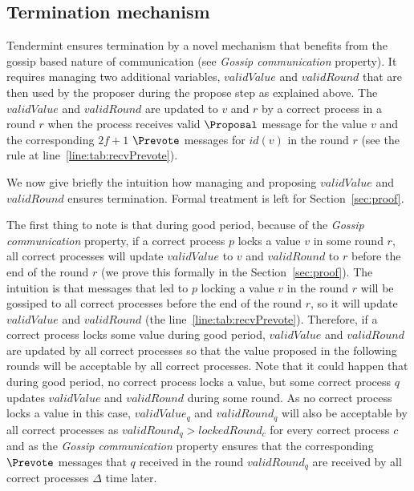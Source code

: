 \subsection{Termination mechanism}

Tendermint ensures termination by a novel mechanism that benefits from the
gossip based nature of communication (see \emph{Gossip communication}
property).  It requires managing two additional variables, $validValue$ and
$validRound$ that are then used by the proposer during the propose step as
explained above.   The $validValue$ and $validRound$ are updated to $v$ and $r$
by a correct process in a round $r$ when the process receives valid $\Proposal$
message for the value $v$ and the corresponding $2f+1$ $\Prevote$ messages for
$id(v)$ in the round $r$ (see the rule at line~\ref{line:tab:recvPrevote}).

We now give briefly the intuition how managing and proposing $validValue$
and $validRound$ ensures termination. Formal treatment is left for
Section~\ref{sec:proof}.  

The first thing to note is that during good period, because of the
\emph{Gossip communication} property, if a correct process $p$ locks a value
$v$ in some round $r$, all correct processes will update $validValue$ to $v$
and $validRound$ to $r$ before the end of the round $r$ (we prove this formally
in the Section~\ref{sec:proof}). The intuition is that messages that led to $p$
locking a value $v$ in the round $r$ will be gossiped to all correct processes
before the end of the round $r$, so it will update $validValue$ and
$validRound$ (the line~\ref{line:tab:recvPrevote}). Therefore, if a correct
process locks some value during good period, $validValue$ and $validRound$ are
updated by all correct processes so that the value proposed in the following
rounds will be acceptable by all correct processes. Note 
that it could happen that during good period, no correct process locks a value,
but some correct process $q$ updates $validValue$ and $validRound$ during some
round. As no correct process locks a value in this case, $validValue_q$ and
$validRound_q$ will also be acceptable by all correct processes as
$validRound_q > lockedRound_c$ for every correct process $c$ and as the
\emph{Gossip communication} property ensures that the corresponding $\Prevote$
messages that $q$ received in the round $validRound_q$ are received by all
correct processes $\Delta$ time later. 

